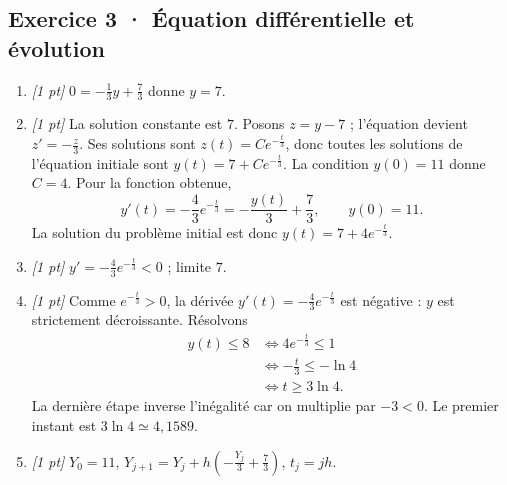\subsection*{Exercice 3 · Équation différentielle et évolution}\begin{enumerate}

\item \textit{[1 pt]} $0=-\frac{1}{3}y+\frac{7}{3}$ donne $y=7$.

\item \textit{[1 pt]} La solution constante est $7$. Posons $z=y-7$ ; l'équation devient $z'=-\frac{z}{3}$. Ses solutions sont $z(t)=Ce^{-\frac{t}{3}}$, donc toutes les solutions de l'équation initiale sont $y(t)=7+Ce^{-\frac{t}{3}}$.
La condition $y(0)=11$ donne $C=4$. Pour la fonction obtenue,
\[y'(t)=-\frac{4}{3}e^{-\frac{t}{3}}=-\frac{y(t)}{3}+\frac{7}{3},\qquad y(0)=11.\]
La solution du problème initial est donc $y(t)=7+4e^{-\frac{t}{3}}$.

\item \textit{[1 pt]} $y'=-\frac{4}{3}e^{-\frac{t}{3}}<0$ ; limite $7$.

\item \textit{[1 pt]} Comme $e^{-\frac{t}{3}}>0$, la dérivée $y'(t)=-\frac{4}{3}e^{-\frac{t}{3}}$ est négative : $y$ est strictement décroissante. Résolvons
\[\begin{aligned}y(t)\le 8&\Longleftrightarrow 4e^{-\frac{t}{3}}\le1\\&\Longleftrightarrow -\frac{t}{3}\le-\ln 4\\&\Longleftrightarrow t\ge 3\ln 4.\end{aligned}\]
La dernière étape inverse l'inégalité car on multiplie par $-3<0$. Le premier instant est $3\ln 4\simeq4{,}1589$.

\item \textit{[1 pt]} $Y_0=11$, $Y_{j+1}=Y_j+h(-\frac{Y_j}{3}+\frac{7}{3})$, $t_j=jh$.

\end{enumerate}

